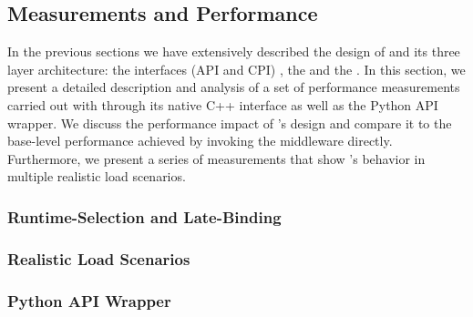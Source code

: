   \subsection{Measurements and Performance}
  
  In the previous sections we have extensively described the design of
  \thesagaimpl and its three layer architecture: the interfaces (API and CPI) ,
  the \thesagaimplrt and the \thesagaimpladap. In this section, we present a
  detailed description and analysis of a set of performance measurements
  carried out with \thesagaimpl through its native C++ interface as well as the
  Python API wrapper. We discuss the performance impact of \thesagaimpl's
  design and compare it to the base-level performance achieved by invoking the
  middleware directly. Furthermore, we present a series of measurements that
  show \thesagaimpl's behavior in multiple realistic load scenarios.
  

  \subsubsection{Runtime-Selection and Late-Binding}

  \subsubsection{Realistic Load Scenarios}

  \subsubsection{Python API Wrapper}

